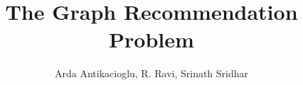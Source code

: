 \documentclass[11pt]{article}
\begin{document}
\title{The Graph Recommendation Problem}
\author{Arda Antikacioglu, R. Ravi, Srinath Sridhar}
\maketitle











{}

\end{document}
